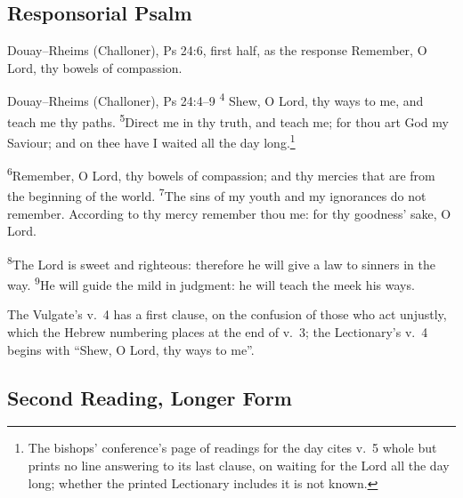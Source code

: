 \subsection{Responsorial Psalm}
\label{proper-responsorial-psalm}


\begin{englishwitness}{Douay--Rheims (Challoner), Ps 24:6, first half, as the response}
Remember, O Lord, thy bowels of compassion.
\end{englishwitness}

\begin{englishwitness}{Douay--Rheims (Challoner), Ps 24:4--9}
\textsuperscript{4} Shew, O Lord, thy ways to me, and teach me thy paths.
\textsuperscript{5}Direct me in thy truth, and teach me; for thou art God my
Saviour; and on thee have I waited all the day long.\footnote{The bishops'
conference's page of readings for the day cites v.~5 whole but prints no line
answering to its last clause, on waiting for the Lord all the day long;
whether the printed Lectionary includes it is not known.}

\textsuperscript{6}Remember, O Lord, thy bowels of compassion; and thy mercies
that are from the beginning of the world. \textsuperscript{7}The sins of my
youth and my ignorances do not remember. According to thy mercy remember thou
me: for thy goodness' sake, O Lord.

\textsuperscript{8}The Lord is sweet and righteous: therefore he will give a
law to sinners in the way. \textsuperscript{9}He will guide the mild in
judgment: he will teach the meek his ways.
\end{englishwitness}

\noindent The Vulgate's v.~4 has a first clause, on the confusion of those who
act unjustly, which the Hebrew numbering places at the end of v.~3; the
Lectionary's v.~4 begins with ``Shew, O Lord, thy ways to me''.

\subsection{Second Reading, Longer Form}
\label{proper-second-reading-long}


